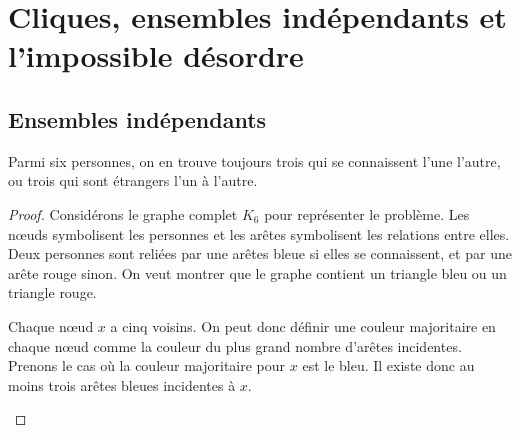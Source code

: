 \section{Cliques, ensembles indépendants et l'impossible désordre}

\subsection{Ensembles indépendants}

\begin{mytheo}  \label{ami1}
  Parmi six personnes, on en trouve toujours trois qui se connaissent l'une l'autre, ou trois qui sont étrangers l'un à l'autre.
  \begin{proof}
     Considérons le graphe complet $K_6$ pour représenter le problème. Les nœuds symbolisent les personnes et les arêtes symbolisent les relations entre elles. Deux personnes sont reliées par une arêtes bleue si elles se connaissent, et par une arête rouge sinon. On veut montrer que le graphe contient un triangle bleu ou un triangle rouge.
     
     Chaque nœud $x$ a cinq voisins. On peut donc définir une couleur majoritaire en chaque nœud comme la couleur du plus grand nombre d'arêtes incidentes. Prenons le cas où la couleur majoritaire pour $x$ est le bleu. Il existe donc au moins trois arêtes bleues incidentes à $x$.
     
   \begin{figure} [!h]
	\end{figure}
     

\end{proof}
\end{mytheo}
